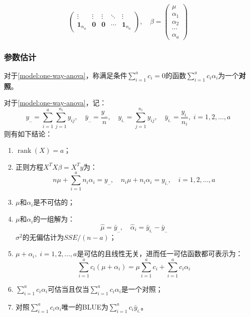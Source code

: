 \begin{definition}
\begin{equation*}
\begin{pmatrix}
			\vdots & \vdots & \vdots & \ddots & \vdots \\
			\mathbf{1}_{n_a} & \mathbf{0} & \mathbf{0} & \cdots & \mathbf{1}_{n_a}
		\end{pmatrix},\quad
		\beta=
		\begin{pmatrix}
			\mu \\
			\alpha_1 \\
			\alpha_2 \\
			\cdots \\
			\alpha_a
		\end{pmatrix}
	\end{equation*}
\end{definition}
\subsubsection{参数估计}
\begin{definition}
	对于\cref{model:one-way-anova}，称满足条件$\sum\limits_{i=1}^{a}c_i=0$的函数$\sum\limits_{i=1}^{a}c_i\alpha_i$为一个\textbf{对照}。
\end{definition}
\begin{theorem}\label{theo:one-way-anova-estimate}
	对于\cref{model:one-way-anova}，记：
	\begin{equation*}
		y_{..}=\sum_{i=1}^a\sum_{j=1}^{n_i}y_{ij},\quad\bar{y}_{..}=\frac{y_{..}}{n},\quad y_{i.}=\sum_{j=1}^{n_i}y_{ij},\quad \bar{y}_{i.}=\frac{y_{i.}}{n_i},\;i=1,2,\dots,a
	\end{equation*}
	则有如下结论：
	\begin{enumerate}
		\item $\operatorname{rank}(X)=a$；
		\item 正则方程$X^TX\beta=X^Ty$为：
		\begin{equation*}
			n\mu+\sum_{i=1}^{a}n_i\alpha_i=y_{..},\quad n_i\mu+n_i\alpha_i=y_{i.},\quad i=1,2,\dots,a
		\end{equation*}
		\item $\mu$和$\alpha_i$是不可估的；
		\item $\mu$和$\alpha_i$的一组解为：
		\begin{equation*}
			\hat{\mu}=\bar{y}_{..},\quad\hat{\alpha}_i=\bar{y}_{i.}-\bar{y}_{..}
		\end{equation*}
		$\sigma^2$的无偏估计为$SSE/(n-a)$；
		\item $\mu+\alpha_i,\;i=1,2,\dots,a$是可估的且线性无关，进而任一可估函数都可表示为：
		\begin{equation*}
			\sum_{i=1}^{a}c_i(\mu+\alpha_i)=\mu\sum_{i=1}^{a}c_i+\sum_{i=1}^{a}c_i\alpha_i
		\end{equation*}
		\item $\sum\limits_{i=1}^{a}c_i\alpha_i$可估当且仅当$\sum\limits_{i=1}^{a}c_i\alpha_i$是一个对照；
		\item 对照$\sum\limits_{i=1}^{a}c_i\alpha_i$唯一的BLUE为$\sum\limits_{i=1}^{a}c_i\bar{y}_{i.}$。
	\end{enumerate}
\end{theorem}
